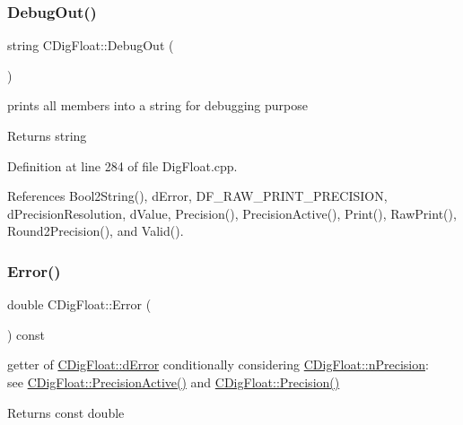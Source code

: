 \subsubsection{\texorpdfstring{Debug\+Out()}{DebugOut()}}
{\footnotesize\ttfamily string C\+Dig\+Float\+::\+Debug\+Out (\begin{DoxyParamCaption}{ }\end{DoxyParamCaption})}



prints all members into a string for debugging purpose 

\begin{DoxyReturn}{Returns}
string 
\end{DoxyReturn}


Definition at line 284 of file Dig\+Float.\+cpp.



References Bool2\+String(), d\+Error, D\+F\+\_\+\+R\+A\+W\+\_\+\+P\+R\+I\+N\+T\+\_\+\+P\+R\+E\+C\+I\+S\+I\+ON, d\+Precision\+Resolution, d\+Value, Precision(), Precision\+Active(), Print(), Raw\+Print(), Round2\+Precision(), and Valid().

\mbox{\label{classCDigFloat_aca8ded79bec9c18f5be1cbbbee59f066}} 
\subsubsection{\texorpdfstring{Error()}{Error()}\hspace{0.1cm}{\footnotesize\ttfamily [1/2]}}
{\footnotesize\ttfamily double C\+Dig\+Float\+::\+Error (\begin{DoxyParamCaption}{ }\end{DoxyParamCaption}) const\hspace{0.3cm}{\ttfamily [inline]}}



getter of \hyperlink{classCDigFloat_a25eb3782d1e727ff007a48f8308e3d4d}{C\+Dig\+Float\+::d\+Error} conditionally considering \hyperlink{classCDigFloat_ad580654be35246d14c91482581c0bc11}{C\+Dig\+Float\+::n\+Precision}\+: ~\newline
 see \hyperlink{classCDigFloat_ad1f2365630c9e35e77c01093e73440c4}{C\+Dig\+Float\+::\+Precision\+Active()} and \hyperlink{classCDigFloat_ad66e2fc1bb19f491dfbc4fb7bfb20d47}{C\+Dig\+Float\+::\+Precision()} 

\begin{DoxyReturn}{Returns}
const double 
\end{DoxyReturn}


